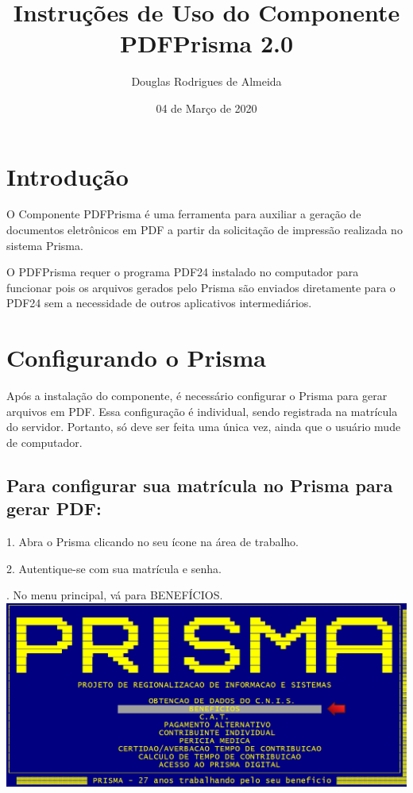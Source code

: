 \documentclass[12pt,a4paper]{article}
\title{Instruções de Uso do Componente PDFPrisma 2.0}
\author{Douglas Rodrigues de Almeida}
\date{04 de Março de 2020}
\begin{document}
\maketitle

\section{Introdução}
O Componente PDFPrisma é uma ferramenta para auxiliar a geração de documentos eletrônicos em PDF a partir da solicitação de impressão realizada no sistema Prisma.

O PDFPrisma requer o programa PDF24 instalado no computador para funcionar pois os arquivos gerados pelo Prisma são enviados diretamente para o PDF24 sem a necessidade de outros aplicativos intermediários.

\section{Configurando o Prisma}
Após a instalação do componente, é necessário configurar o Prisma para gerar arquivos em PDF. Essa configuração é individual, sendo registrada na matrícula do servidor. Portanto, só deve ser feita uma única vez, ainda que o usuário mude de computador.

\subsection{Para configurar sua matrícula no Prisma para gerar PDF:}
1. Abra o Prisma clicando no seu ícone na área de trabalho.

2. Autentique-se com sua matrícula e senha.

. No menu principal, vá para BENEFÍCIOS.\\
\includegraphics[width=1.0\textwidth, center]{menu}\\
\end{document}
